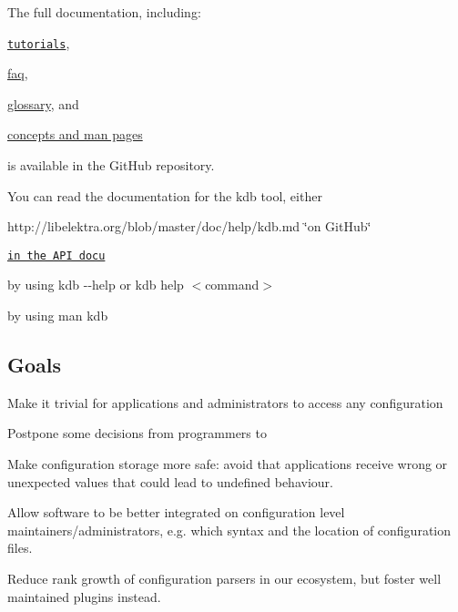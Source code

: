 The full documentation, including\+:


\begin{DoxyItemize}
\item \href{http://libelektra.org/blob/master/doc/tutorials/}{\tt tutorials},
\item \hyperlink{doc_help_elektra-faq_md}{faq},
\item \hyperlink{md_doc_help_elektra-glossary_doc_help_elektra-glossary_md}{glossary}, and
\item \hyperlink{md_doc_help_elektra-introduction_doc_help_elektra-introduction_md}{concepts and man pages}
\end{DoxyItemize}

is available in the Git\+Hub repository.

You can read the documentation for the kdb tool, either


\begin{DoxyItemize}
\item http\+://libelektra.org/blob/master/doc/help/kdb.\+md \char`\"{}on Git\+Hub\char`\"{}
\item \href{http://doc.libelektra.org/api/latest/html/md_doc_help_kdb.html}{\tt in the A\+P\+I docu}
\item by using {\ttfamily kdb -\/-\/help} or {\ttfamily kdb help $<$command$>$}
\item by using {\ttfamily man kdb}
\end{DoxyItemize}

\subsection*{Goals}


\begin{DoxyItemize}
\item Make it trivial for applications and administrators to access any configuration
\item Postpone some decisions from programmers to
\item Make configuration storage more safe\+: avoid that applications receive wrong or unexpected values that could lead to undefined behaviour.
\item Allow software to be better integrated on configuration level maintainers/administrators, e.\+g. which syntax and the location of configuration files.
\item Reduce rank growth of configuration parsers in our ecosystem, but foster well maintained plugins instead.
\end{DoxyItemize}

